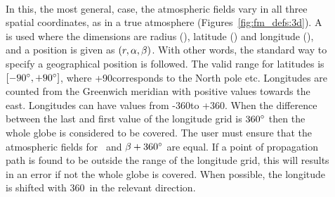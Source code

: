 \begin{description}
\item[\,\,\,] In this, the most general, case, the atmospheric
  fields vary in all three spatial coordinates, as in a true atmosphere
  (Figures~\ref{fig:fm_defs:3d}). A
   is used where the dimensions are
  radius (\Rds), latitude (\Lat) and longitude (\Lon), and a position is given
  as $(r,\alpha,\beta)$. With other words, the standard way to specify a
  geographical position is followed. The valid range for latitudes is
  $[-90^\circ,+90^\circ]$, where +90\degree corresponds to the North pole
  etc. Longitudes are counted from the Greenwich meridian with positive values
  towards the east. Longitudes can have values from -360\degree to +360\degree.
  When the difference between the last and first value of the longitude grid is
  $360^\circ$ then the whole globe is considered to be covered. The user
  must ensure that the atmospheric fields for \Lon\ and $\beta+360^\circ$ are
  equal. If a point of propagation path is found to be outside the range of the
  longitude grid, this will results in an error if not the whole globe is
  covered. When possible, the longitude is shifted with 360\degree\ in the
  relevant direction.
  

\end{description}

